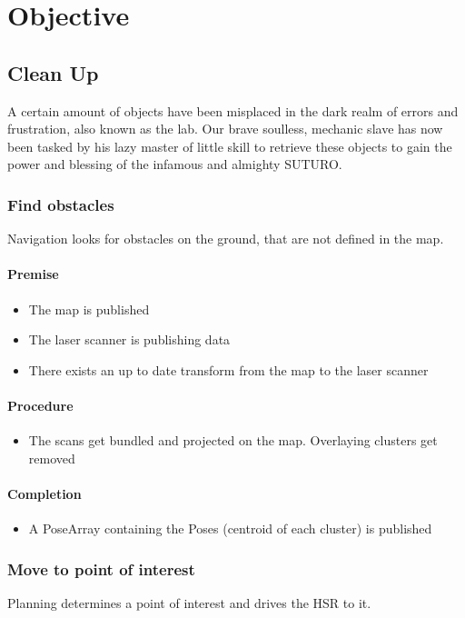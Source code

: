 \documentclass[main.tex]{subfiles}
\begin{document}
	
	\chapter{Objective}
	\section{Clean Up}
	A certain amount of objects have been misplaced in the dark realm of errors and frustration, also known as the lab. Our brave soulless, mechanic slave has now been tasked by his lazy master of little skill to retrieve these objects to gain the power and blessing of the infamous and almighty SUTURO.
	
	\subsection{Find obstacles}
	Navigation looks for obstacles on the ground, that are not defined in the map.
	
	\subsubsection{Premise}
	\begin{itemize}
		\item The map is published
		\item The laser scanner is publishing data
		\item There exists an up to date transform from the map to the laser scanner
	\end{itemize} 
	
	\subsubsection{Procedure}
	\begin{itemize}			
		\item The scans get bundled and projected on the map. Overlaying clusters get removed
	\end{itemize}
	
	\subsubsection{Completion}
	\begin{itemize}
		\item A PoseArray containing the Poses (centroid of each cluster) is published		
	\end{itemize}
	
	\subsection{Move to point of interest}
	Planning determines a point of interest and drives the HSR to it.
	
\end{document}
